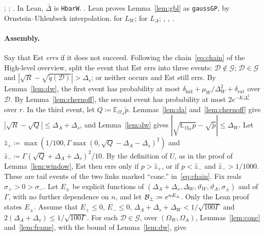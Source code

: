\documentclass[10pt]{article}
\newcommand{\leanver}{v1.1}
\newcommand{\leanrepo}{https://github.com/andrewcritch/beating-sampling-theorem/tree/\leanver/lean/BstLean}
\newenvironment{leanitems}{\par\smallskip\relscale{0.78}\color{gray}\hypersetup{urlcolor=gray}\raggedright%
  \begin{list}{}{\setlength{\leftmargin}{2em}\setlength{\labelwidth}{1.6em}%
  \setlength{\labelsep}{0.4em}\setlength{\itemsep}{0pt}\setlength{\topsep}{0pt}%
  \setlength{\parsep}{0pt}}}{\end{list}\par\medskip}
\newcommand{\Dd}{\mathcal{D}}\newcommand{\Ee}{\mathcal{E}}
\newcommand{\Gg}{\mathcal{G}}\newcommand{\Hh}{\mathcal{H}}
\newcommand{\Est}{\mathrm{Est}}
\newcommand{\EE}{\mathbb{E}}
\begin{document}
\begin{leanitems}
; \href{\leanrepo}{\leanstepC};
\href{\leanrepo}{\leanstepF}.
In Lean, $\bar\Delta$ is \texttt{HbarW}.
. Lean proves
Lemma~\ref{lem:gbl} as \texttt{gaussGP}, by Ornstein--Uhlenbeck
interpolation.
for $L_W$;
for $L_A$; \href{\leanrepo}{\leanstepC}, \href{\leanrepo}{\leanstepD},
\href{\leanrepo}{\leanstepJ}.
\end{leanitems}

\paragraph{Assembly.}
Say that $\Est$ \emph{errs} if it does not succeed. Following the chain~\eqref{eq:chain} of the
High-level overview, split the event that $\Est$ errs into three events:
$\Dd\notin\Gg$; $\Dd\in\Gg$ and $|\sqrt R-\sqrt{\tilde q(\Dd)}|>\Delta_s$; or neither
occurs and $\Est$ still errs. By Lemma~\ref{lem:dw}, the first
event has probability at most
$\delta_{\mathrm{hid}}+\mu_W/\Delta_W^2+\delta_{\mathrm{ext}}$ over $\Dd$.
By Lemma~\ref{lem:chernoff}, the second event has probability at most
$2e^{-K\Delta_s^2}$ over $r$. In the third event, let
$Q\coloneqq\EE_{\Omega_A}\tilde p$. Lemmas~\ref{lem:da}
and~\ref{lem:chernoff} give $|\sqrt R-\sqrt Q|\le\Delta_A+\Delta_s$, and Lemma~\ref{lem:dw}
gives $|\sqrt{\EE_{\Omega_W}p}-\sqrt{\tilde p}|\le\Delta_W$. Let
$\hat z_+\coloneqq\max(1/100,\Gamma\max(0,\sqrt Q-\Delta_A-\Delta_s)^2)$ and
$\hat z_-\coloneqq\Gamma(\sqrt Q+\Delta_A+\Delta_s)^2/10$. By the definition of $U$, as in the proof of
Lemma~\ref{lem:window}, $\Est$ then errs only if $p>\hat z_+$, or if $p<\hat z_-$ and
$\hat z_->1/1000$. These are tail events of the two links marked ``conc.'' in~\eqref{eq:chain}. Fix reals
$\sigma_+>0>\sigma_-$. Let $E_\pm$ be explicit functions of
$(\Delta_A+\Delta_s,\Delta_W,\vartheta_W,\vartheta_A,\sigma_\pm)$ and of $\Gamma$, with no further dependence on $n$,
and let $\mathcal{B}_\pm\coloneqq e^{nE_\pm}$. Only the Lean proof states $E_\pm$. Assume that
$E_+\le0$, $E_-\le0$, $\Delta_A+\Delta_s+\Delta_W<1/\sqrt{100\Gamma}$ and
$2(\Delta_A+\Delta_s)\le1/\sqrt{100\Gamma}$. For each $\Dd\in\Gg$, over $(\Omega_W,\Omega_A)$, Lemmas~\ref{lem:conc}
and~\ref{lem:frame}, with the bound of Lemma~\ref{lem:dw}, give
\end{document}
